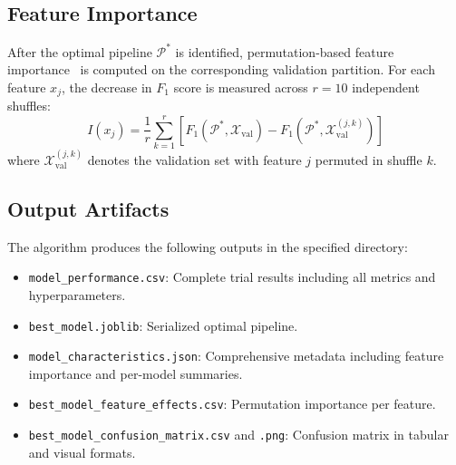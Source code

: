 \documentclass[diagnostics,article,accept,pdftex,moreauthors]{Definitions/mdpi}
\begin{document}
\subsection[\appendixname~\thesubsection]{Feature Importance}
After the optimal pipeline $\mathcal{P}^*$ is identified, permutation-based feature importance~\cite{breiman2001randomforest} is computed on the corresponding validation partition. For each feature $x_j$, the decrease in $F_1$ score is measured across $r = 10$ independent shuffles:
\[
I(x_j) = \frac{1}{r} \sum_{k=1}^{r} \left[ F_1(\mathcal{P}^*, \mathcal{X}_{\text{val}}) - F_1(\mathcal{P}^*, \mathcal{X}_{\text{val}}^{(j,k)}) \right]
\]
where $\mathcal{X}_{\text{val}}^{(j,k)}$ denotes the validation set with feature $j$ permuted in shuffle $k$.

\subsection[\appendixname~\thesubsection]{Output Artifacts}
The algorithm produces the following outputs in the specified directory:
\begin{itemize}
    \item \texttt{model\_performance.csv}: Complete trial results including all metrics and hyperparameters.
    \item \texttt{best\_model.joblib}: Serialized optimal pipeline.
    \item \texttt{model\_characteristics.json}: Comprehensive metadata including feature importance and per-model summaries.
    \item \texttt{best\_model\_feature\_effects.csv}: Permutation importance per feature.
    \item \texttt{best\_model\_confusion\_matrix.csv} and \texttt{.png}: Confusion matrix in tabular and visual formats.
\end{itemize}
\end{document}
